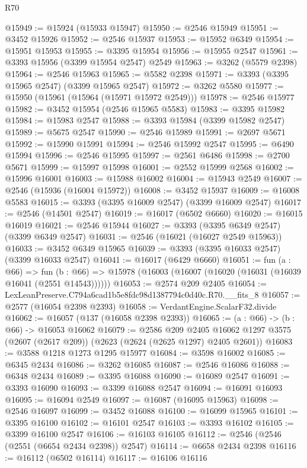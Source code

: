 \begin{lexlean}{R70}
\begin{coremodule}
@15949 := @15924 (@15933 @15947)
@15950 := @2546 @15949
@15951 := @3452 @15926
@15952 := @2546 @15937
@15953 := @15952 @6349
@15954 := @15951 @15953
@15955 := @3395 @15954
@15956 := @15955 @2547
@15961 := @3393 @15956 (@3399 @15954 @2547) @2549
@15963 := @3262 (@5579 @2398)
@15964 := @2546 @15963
@15965 := @5582 @2398
@15971 := @3393 (@3395 @15965 @2547) (@3399 @15965 @2547)
@15972 := @3262 @5580
@15977 := @15950 (@15961 (@15964 (@15971 @15972 @2549)))
@15978 := @2546 @15977
@15982 := @3452 @15954 (@2546 @15965 @5583)
@15983 := @3395 @15982
@15984 := @15983 @2547
@15988 := @3393 @15984 (@3399 @15982 @2547)
@15989 := @5675 @2547
@15990 := @2546 @15989
@15991 := @2697 @5671
@15992 := @15990 @15991
@15994 := @2546 @15992 @2547
@15995 := @6490 @15994
@15996 := @2546 @15995
@15997 := @2561 @6486
@15998 := @2700 @5671
@15999 := @15997 @15998
@16001 := @2552 @15999 @2568
@16002 := @15996 @16001
@16003 := @15988 @16002
@16004 := @15943 @2549
@16007 := @2546 (@15936 (@16004 @15972))
@16008 := @3452 @15937
@16009 := @16008 @5583
@16015 := @3393 (@3395 @16009 @2547) (@3399 @16009 @2547)
@16017 := @2546 (@14501 @2547)
@16019 := @16017 (@6502 @6660)
@16020 := @16015 @16019
@16021 := @2546 @15944
@16027 := @3393 (@3395 @6349 @2547) (@3399 @6349 @2547)
@16031 := @2546 (@16021 (@16027 @2549 @15963))
@16033 := @3452 @6349 @15965
@16039 := @3393 (@3395 @16033 @2547) (@3399 @16033 @2547)
@16041 := @16017 (@6429 @6660)
@16051 := fun (a : @66) =>
  fun (b : @66) => @15978 (@16003 (@16007 (@16020 (@16031 (@16039 @16041 (@2551 @14543))))))
@16053 := @2574 @209 @2405
@16054 := LexLeanPreserve.C794a6cad1b5e8fdc98d1387794c0d40c.R70.__fits_8
@16057 := @2577 (@16054 @2398 @2393)
@16058 := VerdantEngine.ScalarF32.divide
@16062 := @16057 (@137 (@16058 @2398 @2393))
@16065 := (a : @66) -> (b : @66) -> @16053 @16062
@16079 := @2586
    @209
    @2405
    @16062
    @1297
    @3575
    (@2607 (@2617 @209))
    (@2623 (@2624 (@2625 @1297) @2405 @2601))
@16083 := @3588 @1218 @1273 @1295 @15977
@16084 := @3598 @16002
@16085 := @6345 @2434
@16086 := @3262 @16085
@16087 := @2546 @16086
@16088 := @6348 @2434
@16089 := @3395 @16088
@16090 := @16089 @2547
@16091 := @3393 @16090
@16093 := @3399 @16088 @2547
@16094 := @16091 @16093
@16095 := @16094 @2549
@16097 := @16087 (@16095 @15963)
@16098 := @2546 @16097
@16099 := @3452 @16088
@16100 := @16099 @15965
@16101 := @3395 @16100
@16102 := @16101 @2547
@16103 := @3393 @16102
@16105 := @3399 @16100 @2547
@16106 := @16103 @16105
@16112 := @2546 (@2546 (@2551 (@6654 @2434 @2398)) @2547)
@16114 := @6658 @2434 @2398
@16116 := @16112 (@6502 @16114)
@16117 := @16106 @16116

\end{coremodule}
\end{lexlean}

